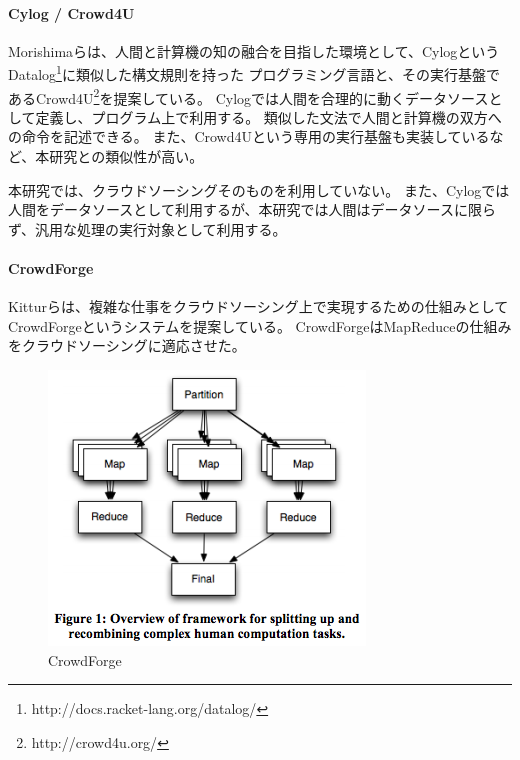 \paragraph{Cylog / Crowd4U}\label{cylog-crowd4u}

\mbox{}

Morishimaらは、人間と計算機の知の融合を目指した環境として、Cylog\cite{cylog}というDatalog\footnote{http://docs.racket-lang.org/datalog/}に類似した構文規則を持った
プログラミング言語と、その実行基盤であるCrowd4U\footnote{http://crowd4u.org/}を提案している。
Cylogでは人間を合理的に動くデータソースとして定義し、プログラム上で利用する。
類似した文法で人間と計算機の双方への命令を記述できる。
また、Crowd4Uという専用の実行基盤も実装しているなど、本研究との類似性が高い。

本研究では、クラウドソーシングそのものを利用していない。
また、Cylogでは人間をデータソースとして利用するが、本研究では人間はデータソースに限らず、汎用な処理の実行対象として利用する。

\paragraph{CrowdForge}\label{crowdforge}

\mbox{}

Kitturら\cite{crowdforge}は、複雑な仕事をクラウドソーシング上で実現するための仕組みとして
CrowdForgeというシステムを提案している。
CrowdForgeはMapReduceの仕組みをクラウドソーシングに適応させた。

\begin{figure}[htbp]
  \begin{center}
  \includegraphics[width=.6\linewidth,bb=0 0 318 276]{images/crowdforge.png}
  \end{center}
  \caption{CrowdForge}
  \label{fig:crowdforge}
\end{figure}


